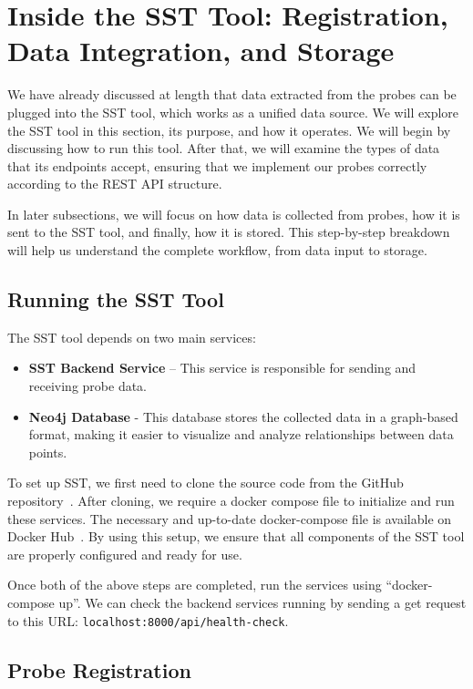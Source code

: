 \section{Inside the SST Tool: Registration, Data Integration, and Storage}\label{sec:sst_tool}

We have already discussed at length that data extracted from the probes can be plugged into the SST tool, which works as a unified data source. We will explore the SST tool in this section, its purpose, and how it operates. We will begin by discussing how to run this tool. After that, we will examine the types of data that its endpoints accept, ensuring that we implement our probes correctly according to the REST API structure.

In later subsections, we will focus on how data is collected from probes, how it is sent to the SST tool, and finally, how it is stored. This step-by-step breakdown will help us understand the complete workflow, from data input to storage.

\subsection{Running the SST Tool}

The SST tool depends on two main services:  
\begin{itemize}
    \item \textbf{SST Backend Service} – This service is responsible for sending and receiving probe data.
    \item \textbf{Neo4j Database} - This database stores the collected data in a graph-based format, making it easier to visualize and analyze relationships between data points.
\end{itemize}

To set up SST, we first need to clone the source code from the GitHub repository~\citep{uds_github}. After cloning, we require a docker compose file to initialize and run these services. The necessary and up-to-date docker-compose file is available on Docker Hub~\citep{sst_dockerhub}. By using this setup, we ensure that all components of the SST tool are properly configured and ready for use.

Once both of the above steps are completed, run the services using ``docker-compose up''. We can check the backend services running by sending a get request to this URL: \texttt{localhost:8000/api/health-check}.

\subsection{Probe Registration}

